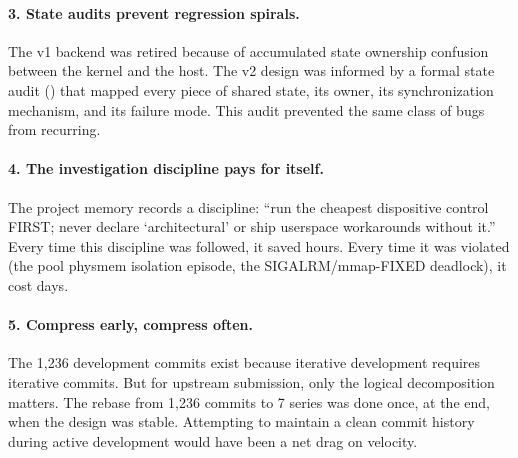 \paragraph{3. State audits prevent regression spirals.}
The v1 \KVM{} backend was retired because of accumulated state
ownership confusion between the \UML{} kernel and the \KVM{} host.
The v2 design was informed by a formal state audit
() that mapped
every piece of shared state, its owner, its synchronization mechanism,
and its failure mode.  This audit prevented the same class of bugs
from recurring.

\paragraph{4. The investigation discipline pays for itself.}
The project memory records a discipline: ``run the cheapest
dispositive control FIRST; never declare `architectural' or ship
userspace workarounds without it.''  Every time this discipline was
followed, it saved hours.  Every time it was violated (the pool
physmem isolation episode, the SIGALRM/mmap-FIXED deadlock), it cost
days.

\paragraph{5. Compress early, compress often.}
The 1,236 development commits exist because iterative development
requires iterative commits.  But for upstream submission, only the
logical decomposition matters.  The rebase from 1,236 commits to 7
series was done once, at the end, when the design was stable.
Attempting to maintain a clean commit history during active
development would have been a net drag on velocity.
